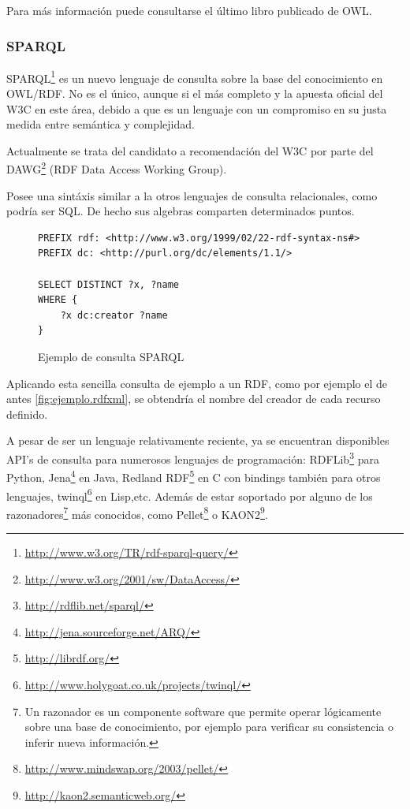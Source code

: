 Para más información puede consultarse el último libro publicado de 
OWL\cite{OWLBook}.

\subsubsection{SPARQL}

SPARQL\footnote{\url{http://www.w3.org/TR/rdf-sparql-query/}} es un nuevo lenguaje
de consulta sobre la base del conocimiento en OWL/RDF. No es el único\cite{ComparisonRDFQuery},
aunque si el más completo y la apuesta oficial del W3C en este área, debido a que es
un lenguaje con un compromiso en su justa medida entre semántica y 
complejidad\cite{SemanticsComplexitySPARQL}. 

Actualmente se trata del candidato a recomendación del W3C por parte del 
DAWG\footnote{\url{http://www.w3.org/2001/sw/DataAccess/}} (RDF Data Access Working 
Group).

Posee una sintáxis similar a la otros lenguajes de consulta relacionales, como
podría ser SQL. De hecho sus algebras comparten\cite{RelationalAlgebraSPARQL} 
determinados puntos. 

\begin{figure}[H]
\begin{lstlisting}
PREFIX rdf: <http://www.w3.org/1999/02/22-rdf-syntax-ns#>
PREFIX dc: <http://purl.org/dc/elements/1.1/>

SELECT DISTINCT ?x, ?name
WHERE {
	?x dc:creator ?name
}
\end{lstlisting}
\caption{Ejemplo de consulta SPARQL}
\label{fig:ejemplo.sparql}
\end{figure}

Aplicando esta sencilla consulta de ejemplo a un RDF, como por ejemplo el de 
antes \ref{fig:ejemplo.rdfxml}, se obtendría el nombre del creador de cada recurso
definido.

A pesar de ser un lenguaje relativamente reciente, ya se encuentran disponibles
API's de consulta para numerosos lenguajes de programación: 
RDFLib\footnote{\url{http://rdflib.net/sparql/}} para Python, 
Jena\footnote{\url{http://jena.sourceforge.net/ARQ/}} en Java, 
Redland RDF\footnote{\url{http://librdf.org/}} en C con bindings también para 
otros lenguajes, twinql\footnote{\url{http://www.holygoat.co.uk/projects/twinql/}} 
en Lisp,etc. Además de estar soportado por alguno de los razonadores\footnote{Un 
razonador es un componente software que permite operar lógicamente sobre una base 
de conocimiento, por ejemplo para verificar su consistencia o inferir nueva
información.} más conocidos, como Pellet\footnote{\url{http://www.mindswap.org/2003/pellet/}} 
o KAON2\footnote{\url{http://kaon2.semanticweb.org/}}.

